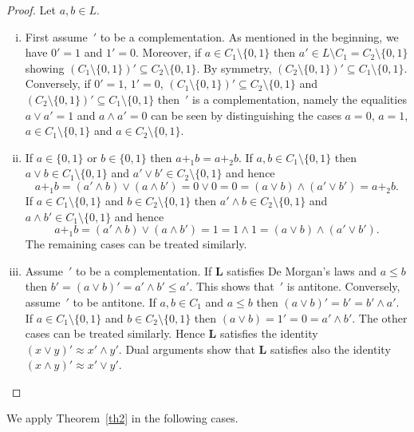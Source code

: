 \documentclass[12pt]{article}
\begin{document}
\begin{proof}
Let $a,b\in L$.
\begin{enumerate}[(i)]
\item First assume $\,'$ to be a complementation. As mentioned in the beginning, we have $0'=1$ and $1'=0$. Moreover, if $a\in C_1\setminus\{0,1\}$ then $a'\in L\setminus C_1=C_2\setminus\{0,1\}$ showing	$(C_1\setminus\{0,1\})'\subseteq C_2\setminus\{0,1\}$. By symmetry, $(C_2\setminus\{0,1\})'\subseteq C_1\setminus\{0,1\}$. Conversely, if $0'=1$, $1'=0$, $(C_1\setminus\{0,1\})'\subseteq C_2\setminus\{0,1\}$ and $(C_2\setminus\{0,1\})'\subseteq C_1\setminus\{0,1\}$ then $\,'$ is a complementation, namely the equalities $a\vee a'=1$ and $a\wedge a'=0$ can be seen by distinguishing the cases $a=0$, $a=1$, $a\in C_1\setminus\{0,1\}$ and $a\in C_2\setminus\{0,1\}$.
\item If $a\in\{0,1\}$ or $b\in\{0,1\}$ then $a+_1b=a+_2b$. If $a,b\in C_1\setminus\{0,1\}$ then $a\vee b\in C_1\setminus\{0,1\}$ and $a'\vee b'\in C_2\setminus\{0,1\}$ and hence
\[
a+_1b=(a'\wedge b)\vee(a\wedge b')=0\vee0=0=(a\vee b)\wedge(a'\vee b')=a+_2b.
\]
If $a\in C_1\setminus\{0,1\}$ and $b\in C_2\setminus\{0,1\}$ then $a'\wedge b\in C_2\setminus\{0,1\}$ and $a\wedge b'\in C_1\setminus\{0,1\}$ and hence
\[
a+_1b=(a'\wedge b)\vee(a\wedge b')=1=1\wedge1=(a\vee b)\wedge(a'\vee b').
\]
The remaining cases can be treated similarly.
\item Assume $\,'$ to be a complementation. If $\mathbf L$ satisfies De Morgan's laws and $a\le b$ then $b'=(a\vee b)'=a'\wedge b'\le a'$. This shows that $\,'$ is antitone. Conversely, assume $\,'$ to be antitone. If $a,b\in C_1$ and $a\le b$ then $(a\vee b)'=b'=b'\wedge a'$. If $a\in C_1\setminus\{0,1\}$ and $b\in C_2\setminus\{0,1\}$ then $(a\vee b)=1'=0=a'\wedge b'$. The other cases can be treated similarly. Hence $\mathbf L$ satisfies the identity $(x\vee y)'\approx x'\wedge y'$. Dual arguments show that $\mathbf L$ satisfies also the identity $(x\wedge y)'\approx x'\vee y'$.
\end{enumerate}
\end{proof}

We apply Theorem~\ref{th2} in the following cases.
\end{document}
